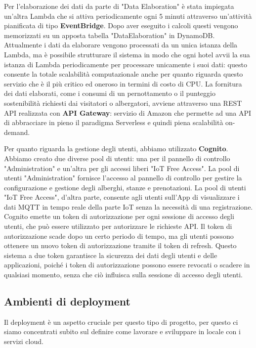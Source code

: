 Per l'elaborazione dei dati da parte di "Data Elaboration" è stata impiegata un'altra Lambda che si attiva periodicamente ogni 5 minuti attraverso un'attività pianificata di tipo \textbf{EventBridge}. Dopo aver eseguito i calcoli questi vengono memorizzati su un apposta tabella "DataElaboration" in DynamoDB.
Attualmente i dati da elaborare vengono processati da un unica istanza della Lambda, ma è possibile strutturare il sistema in modo che ogni hotel avvii la sua istanza di Lambda periodicamente per processare unicamente i suoi dati: questo consente la totale scalabilità computazionale anche per quanto riguarda questo servizio che è il più critico ed oneroso in termini di costo di CPU.
La fornitura dei dati elaborati, come i consumi di un pernottamento o il punteggio sostenibilità richiesti dai visitatori o albergatori, avviene attraverso una REST API realizzata con \textbf{API Gateway}: servizio di Amazon che permette ad una API di abbracciare in pieno il paradigma Serverless e quindi piena scalabilità on-demand.

Per quanto riguarda la gestione degli utenti, abbiamo utilizzato \textbf{Cognito}. Abbiamo creato due diverse pool di utenti: una per il pannello di controllo "Administration" e un'altra per gli accessi liberi "IoT Free Access". La pool di utenti "Administration" fornisce l'accesso al pannello di controllo per gestire la configurazione e gestione degli alberghi, stanze e prenotazioni. La pool di utenti "IoT Free Access", d'altra parte, consente agli utenti sull'App di visualizzare i dati MQTT in tempo reale della parte IoT senza la necessità di una registrazione.
Cognito emette un token di autorizzazione per ogni sessione di accesso degli utenti, che può essere utilizzato per autorizzare le richieste API. Il token di autorizzazione scade dopo un certo periodo di tempo, ma gli utenti possono ottenere un nuovo token di autorizzazione tramite il token di refresh. Questo sistema a due token garantisce la sicurezza dei dati degli utenti e delle applicazioni, poiché i token di autorizzazione possono essere revocati o scadere in qualsiasi momento, senza che ciò influisca sulla sessione di accesso degli utenti. 

\subsection{Ambienti di deployment}

Il deployment è un aspetto cruciale per questo tipo di progetto, per questo ci siamo concentrati subito sul definire come lavorare e sviluppare in locale con i servizi cloud.

